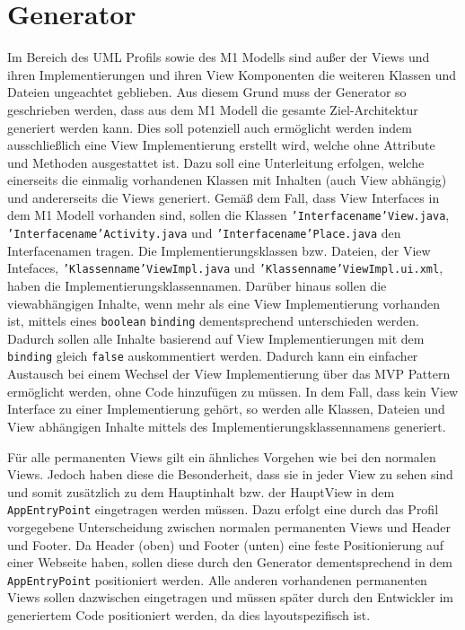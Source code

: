 \section{Generator}\label{AufBGenerator}
Im Bereich des UML Profils sowie des M1 Modells sind außer der Views und ihren
Implementierungen und ihren View Komponenten die weiteren Klassen und Dateien
ungeachtet geblieben. Aus diesem Grund muss der Generator so geschrieben werden,
dass aus dem M1 Modell die gesamte Ziel-Architektur generiert werden kann.
Dies soll potenziell auch ermöglicht werden indem ausschließlich eine View
Implementierung erstellt wird, welche ohne Attribute und Methoden ausgestattet ist. Dazu soll
eine Unterleitung erfolgen, welche einerseits die einmalig vorhandenen Klassen
mit Inhalten (auch View abhängig) und andererseits die Views
generiert. Gemäß dem Fall, dass View Interfaces in dem M1 Modell vorhanden sind,
sollen die Klassen \texttt{'Interfacename'View.java},
\texttt{'Interfacename'Activity.java} und \texttt{'Interfacename'Place.java} den Interfacenamen tragen. Die
Implementierungsklassen bzw. Dateien, der View Intefaces,
\texttt{'Klassenname'ViewImpl.java} und \texttt{'Klassenname'ViewImpl.ui.xml}, haben die
Implementierungsklassennamen. Darüber hinaus sollen die viewabhängigen Inhalte,
wenn mehr als eine View Implementierung vorhanden ist, mittels eines
\texttt{boolean} \texttt{binding} dementsprechend unterschieden werden. Dadurch
sollen alle Inhalte basierend auf View Implementierungen mit dem
\texttt{binding} gleich \texttt{false} auskommentiert werden.
Dadurch kann ein einfacher Austausch bei einem Wechsel der View Implementierung
über das MVP Pattern ermöglicht werden, ohne Code hinzufügen zu müssen.
In dem Fall, dass kein View Interface zu einer Implementierung gehört, so werden
alle Klassen, Dateien und View abhängigen Inhalte mittels des
Implementierungsklassennamens generiert.

Für alle permanenten Views gilt ein
ähnliches Vorgehen wie bei den normalen Views. Jedoch haben diese die
Besonderheit, dass sie in jeder View zu sehen sind und somit zusätzlich zu dem
Hauptinhalt bzw. der HauptView in dem \texttt{AppEntryPoint} eingetragen
werden müssen. Dazu erfolgt eine durch das Profil vorgegebene Unterscheidung
zwischen normalen permanenten Views und Header und Footer. Da Header (oben) und Footer
(unten) eine feste Positionierung auf einer Webseite haben, sollen diese durch
den Generator dementsprechend in dem \texttt{AppEntryPoint} positioniert
werden.
Alle anderen vorhandenen permanenten Views sollen dazwischen eingetragen
und müssen später durch den Entwickler im generiertem Code positioniert werden,
da dies layoutspezifisch ist.

